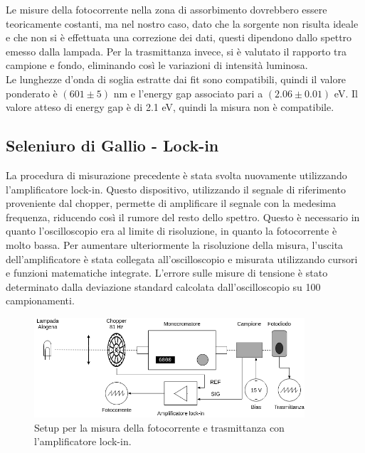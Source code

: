 \documentclass[11pt]{article} %
\begin{document}
Le misure della fotocorrente nella zona di assorbimento dovrebbero essere teoricamente costanti, ma nel nostro caso, dato che la sorgente non risulta ideale e che non si è effettuata una correzione dei dati, questi dipendono dallo spettro emesso dalla lampada. Per la trasmittanza invece, si è valutato il rapporto tra campione e fondo, eliminando così le variazioni di intensità luminosa.\\
Le lunghezze d'onda di soglia estratte dai fit sono compatibili, quindi il valore ponderato è $\left(601\pm5\right)$ nm e l'energy gap associato pari a $\left(2.06\pm0.01\right)$ eV. Il valore atteso di energy gap è di 2.1 eV, quindi la misura non è compatibile.
\newpage
\subsection{Seleniuro di Gallio - Lock-in}
La procedura di misurazione precedente è stata svolta nuovamente utilizzando l'amplificatore lock-in. Questo dispositivo, utilizzando il segnale di riferimento proveniente dal chopper, permette di amplificare il segnale con la medesima frequenza, riducendo così il rumore del resto dello spettro. Questo è necessario in quanto l'oscilloscopio era al limite di risoluzione, in quanto la fotocorrente è molto bassa. Per aumentare ulteriormente la risoluzione della misura, l'uscita dell'amplificatore è stata collegata all'oscilloscopio e misurata utilizzando cursori e funzioni matematiche integrate. L'errore sulle misure di tensione è stato determinato dalla deviazione standard calcolata dall'oscilloscopio su 100 campionamenti.
\begin{figure}[h!]
\begin{center}
\includegraphics[width=380px]{img/foto_lock.png}
\caption{Setup per la misura della fotocorrente e trasmittanza con l'amplificatore lock-in.}
\end{center}
\end{figure}
\end{document}
